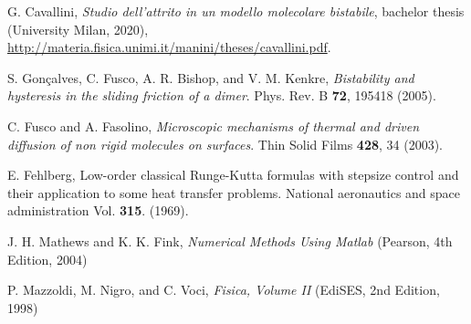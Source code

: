 \documentclass[a4paper,12pt]{article}
\begin{document}
\begin{thebibliography}{9}


G. Cavallini, {\it Studio dell’attrito in un modello
molecolare bistabile}, bachelor thesis (University Milan, 2020), \url{http://materia.fisica.unimi.it/manini/theses/cavallini.pdf}.

S. Gonçalves, C. Fusco, A. R. Bishop, and V. M. Kenkre, \textit{Bistability and
hysteresis in the sliding friction of a dimer}. Phys. Rev. B \textbf{72}, 195418 (2005).

C. Fusco and A. Fasolino, \textit{Microscopic mechanisms of thermal and driven diffusion of non rigid molecules on surfaces}. Thin Solid Films \textbf{428}, 34 (2003).

E. Fehlberg, Low-order classical Runge-Kutta formulas with stepsize control and their application to some heat transfer problems. National aeronautics and space administration Vol. \textbf{315}.  (1969).

J. H. Mathews and K. K. Fink, \textit{Numerical Methods Using Matlab} (Pearson, 4th Edition, 2004)

P. Mazzoldi, M. Nigro, and C. Voci,  \textit{Fisica, Volume II} (EdiSES, 2nd Edition, 1998) 




\end{thebibliography}

%
%
\clearpage
\thispagestyle{empty} \qquad
\end{document}
